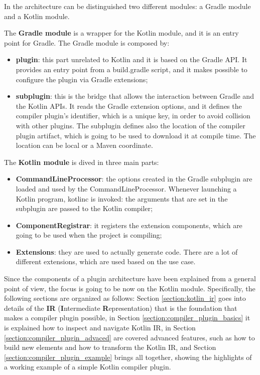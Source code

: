 In the architecture can be distinguished two different modules: a Gradle module and a Kotlin module.

The \textbf{Gradle module} is a wrapper for the Kotlin module, and it is an entry point for Gradle. The Gradle module is composed by:
\begin{itemize}
    \item \textbf{plugin}: this part unrelated to Kotlin and it is based on the Gradle API. It provides an entry point from a build.gradle script, and it makes possible to configure the plugin via Gradle extensions;
    \item \textbf{subplugin}: this is the bridge that allows the interaction between Gradle and the Kotlin APIs. It reads the Gradle extension options, and it defines the compiler plugin's identifier, which is a unique key, in order to avoid collision with other plugins. The subplugin defines also the location of the compiler plugin artifact, which is going to be used to download it at compile time. The location can be local or a Maven coordinate.
\end{itemize}

\noindent The \textbf{Kotlin module} is dived in three main parts:
\begin{itemize}
    \item \textbf{CommandLineProcessor}: the options created in the Gradle subplugin are loaded and used by the CommandLineProcessor. Whenever launching a Kotlin program, kotlinc is invoked: the arguments that are set in the subplugin are passed to the Kotlin compiler;
    \item \textbf{ComponentRegistrar}: it registers the extension components, which are going to be used when the project is compiling;
    \item \textbf{Extensions}: they are used to actually generate code. There are a lot of different extensions, which are used based on the use case.
\end{itemize}

Since the components of a plugin architecture have been explained from a general point of view, the focus is going to be now on the Kotlin module.
Specifically, the following sections are organized as follows: Section \ref{section:kotlin_ir} goes into details of the \textbf{IR} (\textbf{I}ntermediate \textbf{R}epresentation) that is the foundation that makes a compiler plugin possible, in Section \ref{section:compiler_plugin_basics} it is explained how to inspect and navigate Kotlin IR, in Section \ref{section:compiler_plugin_advaced} are covered advanced features, such as how to build new elements and how to transform the Kotlin IR, and Section \ref{section:compiler_plugin_example} brings all together, showing the highlights of a working example of a simple Kotlin compiler plugin.

